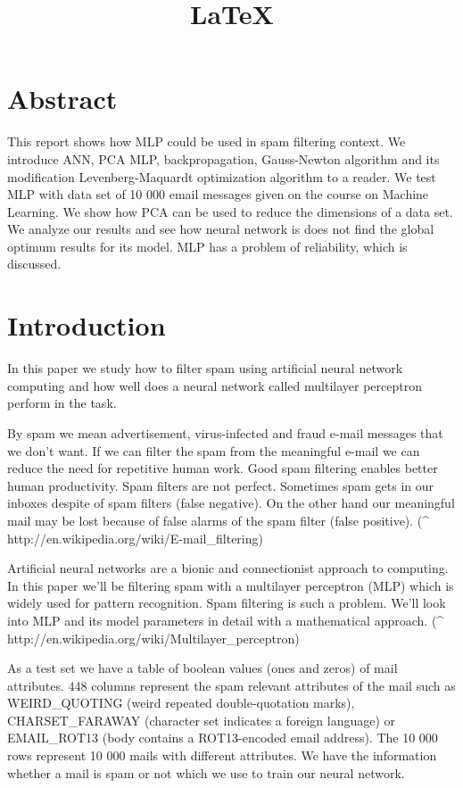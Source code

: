 \documentclass[12pt]{article}
\title{\LaTeX}
\date{}
\begin{document}
  \maketitle


  \section{Abstract}
  
  This report shows how MLP could be used in spam filtering context. We introduce ANN, PCA MLP, backpropagation, Gauss-Newton algorithm and its modification Levenberg-Maquardt optimization algorithm to a reader. We test MLP with data set of 10 000 email messages given on the course on Machine Learning. We show how PCA can be used to reduce the dimensions of a data set. We analyze our results and see how neural network is does not find the global optimum results for its model. MLP has a problem of reliability, which is discussed.
  
  \section{Introduction}
  
  In this paper we study how to filter spam using artificial neural network computing and how well does a neural network called multilayer perceptron perform in the task.


By spam we mean advertisement, virus-infected and fraud e-mail messages that we don’t want. If we can filter the spam from the meaningful e-mail we can reduce the need for repetitive human work. Good spam filtering enables better human productivity. Spam filters are not perfect. Sometimes spam gets in our inboxes despite of spam filters (false negative). On the other hand our meaningful mail may be lost because of false alarms of the spam filter (false positive). (^ http://en.wikipedia.org/wiki/E-mail_filtering)


Artificial neural networks are a bionic and connectionist approach to computing. In this paper we’ll be filtering spam with a multilayer perceptron (MLP) which is widely used for pattern recognition. Spam filtering is such a problem. We’ll look into MLP and its model parameters in detail with a mathematical approach. (^ http://en.wikipedia.org/wiki/Multilayer_perceptron)


As a test set we have a table of boolean values (ones and zeros) of mail attributes. 448 columns represent the spam relevant attributes of the mail such as WEIRD_QUOTING (weird repeated double-quotation marks), CHARSET_FARAWAY (character set indicates a foreign language) or EMAIL_ROT13 (body contains a ROT13-encoded email address). The 10 000 rows represent 10 000 mails with different attributes. We have the information whether a mail is spam or not which we use to train our neural network.
\end{document}
